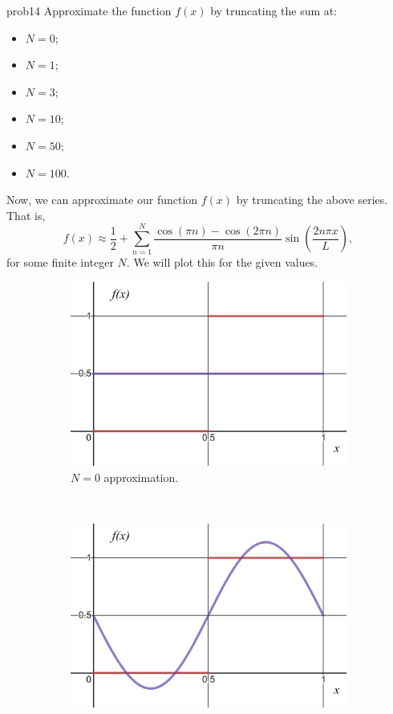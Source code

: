 \documentclass{article}
\begin{document}
\begin{solution}{}{prob14}
		Approximate the function $f(x)$ by truncating the sum at:
		\begin{itemize}
			\item $N=0$;
			\item $N=1$;
			\item $N=3$;
			\item $N=10$;
			\item $N=50$;
			\item $N=100$.
		\end{itemize}
		\tcblower
		Now, we can approximate our function $f(x)$ by truncating the above series. That is, 
		\[
		f(x)\approx \frac{1}{2} + \sum_{n=1}^N \frac{\cos(\pi n)-\cos(2\pi n)}{\pi n}\sin\left(\frac{2n \pi x}{L}\right),
		\]
		for some finite integer $N$. We will plot this for the given values.
\begin{figure}[H]
	\centering
	\begin{subfigure}[h]{0.3\textwidth}
		\includegraphics[width=\textwidth]{N=0.png}
		\caption{$N=0$ approximation.}
	\end{subfigure}
	~ 
	\begin{subfigure}[h]{0.3\textwidth}
		\includegraphics[width=\textwidth]{N=1.png}

\end{subfigure}
\end{figure}
\end{solution}
\end{document}
